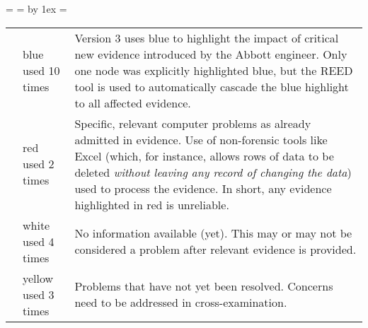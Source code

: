 =\hbox{}%
 =  \advance {} by 1ex  = 
\begin{tabular}{@{}clp{3.75in}}
\vphantom{\copy0}{blue}&blue used 10 times&Version 3 uses blue to highlight the impact of critical new evidence introduced by the Abbott engineer. Only one node was explicitly highlighted blue, but the REED tool is used to automatically cascade the blue highlight to all affected evidence.\\ 
{red}&red used 2 times&Specific, relevant computer problems as already admitted in evidence. Use of non-forensic tools like Excel (which, for instance, allows rows of data to be deleted \emph{without leaving any record of changing the data\/}) used to process the evidence. In short, any evidence highlighted in red is unreliable.\\ 
{white}&white used 4 times&No information available (yet). This may or may not be considered a problem after relevant evidence is provided.\\ 
{yellow}&yellow used 3 times&Problems that have not yet been resolved. Concerns need to be addressed in cross-examination.\\ 
 \end{tabular}

